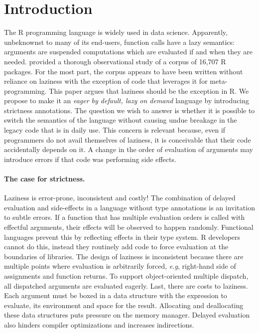 \documentclass[review,nonacm,screen,acmsmall,anonymous=true]{acmart}
\begin{document}


\maketitle
\section{Introduction}

The R programming language is widely used in data science. Apparently,
unbeknownst to many of its end-users, function calls have a lazy semantics:
arguments are suspended computations which are evaluated if and when they are
needed. \citet{oopsla19b} provided a thorough observational study of a corpus of
16,707 R packages. For the most part, the corpus appears to have been written
without reliance on laziness with the exception of code that leverages it for
meta-programming. This paper argues that laziness should be the exception in R.
We propose to make it an \emph{eager by default, lazy on demand} language by
introducing strictness annotations. The question we wish to answer is whether it
is possible to switch the semantics of the language without causing undue
breakage in the legacy code that is in daily use. This concern is relevant
because, even if programmers do not avail themselves of laziness, it is
conceivable that their code accidentally depends on it. A change in the order of
evaluation of arguments may introduce errors if that code was performing side
effects.

\paragraph{The case for strictness.} Laziness is error-prone, inconsistent
and costly! The combination of delayed evaluation and side-effects in a language
without type annotations is an invitation to subtle errors. If a function that
has multiple evaluation orders is called with effectful arguments, their effects
will be observed to happen randomly. Functional languages prevent this by reflecting
effects in their type system. R developers cannot do this, instead they
routinely add code to force evaluation at the boundaries of libraries. The design
of laziness is inconsistent because there are multiple points where evaluation
is arbitrarily forced, \emph{e.g}, right-hand side of assignments and function
returns. To support object-oriented multiple dispatch, all dispatched arguments
are evaluated eagerly. Last, there are costs to laziness. Each argument must be
boxed in a data structure with the expression to evaluate, its environment and
space for the result. Allocating and deallocating these data structures puts
pressure on the memory manager. Delayed evaluation also hinders compiler
optimizations and increases indirections.
\end{document}
